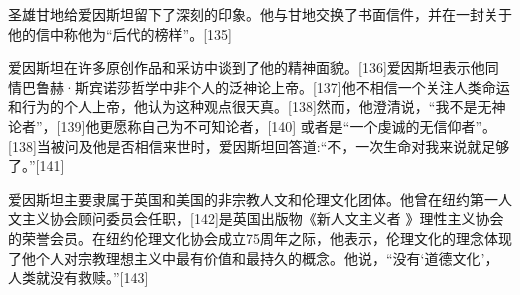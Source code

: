 圣雄甘地给爱因斯坦留下了深刻的印象。他与甘地交换了书面信件，并在一封关于他的信中称他为“后代的榜样”。[135]

爱因斯坦在许多原创作品和采访中谈到了他的精神面貌。[136]爱因斯坦表示他同情巴鲁赫·斯宾诺莎哲学中非个人的泛神论上帝。[137]他不相信一个关注人类命运和行为的个人上帝，他认为这种观点很天真。[138]然而，他澄清说，“我不是无神论者”，[139]他更愿称自己为不可知论者，[140] 或者是“一个虔诚的无信仰者”。[138]当被问及他是否相信来世时，爱因斯坦回答道:“不，一次生命对我来说就足够了。”[141]

爱因斯坦主要隶属于英国和美国的非宗教人文和伦理文化团体。他曾在纽约第一人文主义协会顾问委员会任职，[142]是英国出版物《新人文主义者 》理性主义协会的荣誉会员。在纽约伦理文化协会成立75周年之际，他表示，伦理文化的理念体现了他个人对宗教理想主义中最有价值和最持久的概念。他说，“没有‘道德文化’，人类就没有救赎。”[143]